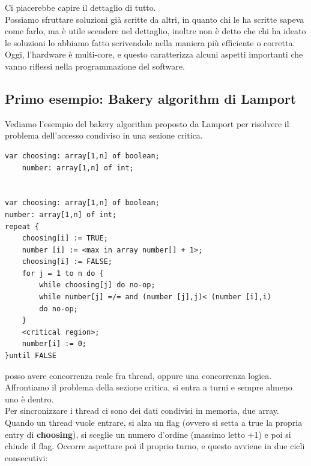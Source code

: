 \documentclass[12pt, oneside]{extbook}
\begin{document}
Ci piacerebbe capire il dettaglio di tutto.\\ Possiamo sfruttare soluzioni già scritte da altri, in quanto chi le ha scritte sapeva come farlo, ma è utile scendere nel dettaglio, inoltre non è detto che chi ha ideato le soluzioni lo abbiamo fatto scrivendole nella maniera più efficiente o corretta. Oggi, l'hardware è multi-core, e questo caratterizza alcuni aspetti importanti che vanno riflessi nella programmazione del software.
\subsection{Primo esempio: Bakery algorithm di Lamport}
Vediamo l'esempio del bakery algorithm proposto da Lamport per risolvere il problema dell'accesso condiviso in una sezione critica.
\begin{lstlisting}
var choosing: array[1,n] of boolean;
	number: array[1,n] of int;


var choosing: array[1,n] of boolean;
number: array[1,n] of int;
repeat {
	choosing[i] := TRUE;
	number [i] := <max in array number[] + 1>;
	choosing[i] := FALSE;
	for j = 1 to n do {
		while choosing[j] do no-op;
		while number[j] =/= and (number [j],j)< (number [i],i)
		do no-op;
	}
	<critical region>;
	number[i] := 0;
}until FALSE
\end{lstlisting}
posso avere concorrenza reale fra thread, oppure una concorrenza logica. Affrontiamo il problema della sezione critica, si entra a turni e sempre almeno uno è dentro.\\ Per sincronizzare i thread ci sono dei dati condivisi in memoria, due array.\\ Quando un thread vuole entrare, si alza un flag (ovvero si setta a true la propria entry di \textbf{choosing}), si sceglie un numero d'ordine (massimo letto +1) e poi si chiude il flag. Occorre aspettare poi il proprio turno, e questo avviene in due cicli consecutivi:
\end{document}
